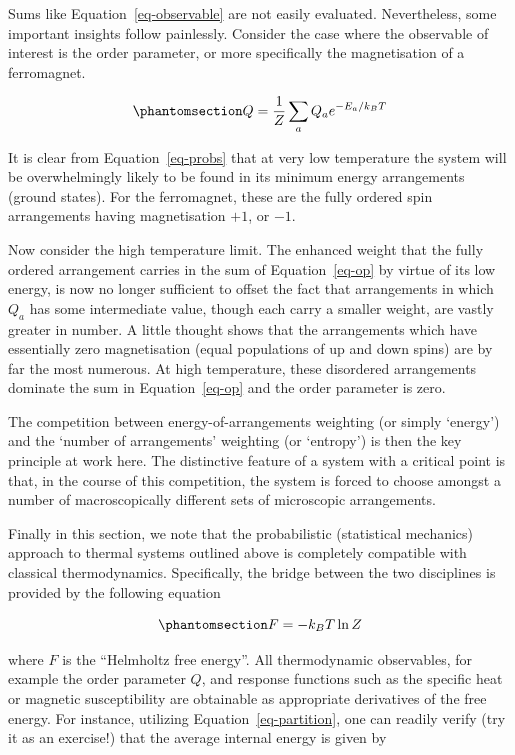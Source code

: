 \documentclass[
  letterpaper,
  enabledeprecatedfontcommands]{report}
\begin{document}
Sums like Equation~\ref{eq-observable} are not easily evaluated.
Nevertheless, some important insights follow painlessly. Consider the
case where the observable of interest is the order parameter, or more
specifically the magnetisation of a ferromagnet.

\begin{equation}\phantomsection\label{eq-op}{
Q=\frac{1}{Z}\sum_a Q_a e^{-E_a/k_BT}
}\end{equation}

It is clear from Equation~\ref{eq-probs} that at very low temperature
the system will be overwhelmingly likely to be found in its minimum
energy arrangements (ground states). For the ferromagnet, these are the
fully ordered spin arrangements having magnetisation \(+1\), or \(-1\).

Now consider the high temperature limit. The enhanced weight that the
fully ordered arrangement carries in the sum of Equation~\ref{eq-op} by
virtue of its low energy, is now no longer sufficient to offset the fact
that arrangements in which \(Q_a\) has some intermediate value, though
each carry a smaller weight, are vastly greater in number. A little
thought shows that the arrangements which have essentially zero
magnetisation (equal populations of up and down spins) are by far the
most numerous. At high temperature, these disordered arrangements
dominate the sum in Equation~\ref{eq-op} and the order parameter is
zero.

The competition between energy-of-arrangements weighting (or simply
`energy') and the `number of arrangements' weighting (or `entropy') is
then the key principle at work here. The distinctive feature of a system
with a critical point is that, in the course of this competition, the
system is forced to choose amongst a number of macroscopically different
sets of microscopic arrangements.

Finally in this section, we note that the probabilistic (statistical
mechanics) approach to thermal systems outlined above is completely
compatible with classical thermodynamics. Specifically, the bridge
between the two disciplines is provided by the following equation

\begin{equation}\phantomsection\label{eq-free}{
F=-k_BT \ln Z
}\end{equation}

where \(F\) is the ``Helmholtz free energy''. All thermodynamic
observables, for example the order parameter \(Q\), and response
functions such as the specific heat or magnetic susceptibility are
obtainable as appropriate derivatives of the free energy. For instance,
utilizing Equation~\ref{eq-partition}, one can readily verify (try it as
an exercise!) that the average internal energy is given by
\end{document}
